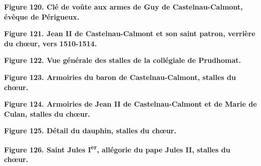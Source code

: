 \documentclass[12pt,twoside,openany]{book}
\begin{document}
\begin{center}
\par\small \textbf{Figure 120. Clé de voûte aux armes de Guy de Castelnau-Calmont, évêque de Périgueux.}
\end{center}

\begin{center}
\par\small \textbf{Figure 121. Jean II de Castelnau-Calmont et son saint patron, verrière du chœur, vers 1510-1514.}
\end{center}

\begin{center}
\par\small \textbf{Figure 122. Vue générale des stalles de la collégiale de Prudhomat.}
\end{center}

\begin{center}
\par\small \textbf{Figure 123. Armoiries du baron de Castelnau-Calmont, stalles du chœur.}
\end{center}

\begin{center}
\par\small \textbf{Figure 124. Armoiries de Jean II de Castelnau-Calmont et de Marie de Culan, stalles du chœur.}
\end{center}

\begin{center}
\par\small \textbf{Figure 125. Détail du dauphin, stalles du chœur.}
\end{center}

\begin{center}
\par\small \textbf{Figure 126. Saint Jules I\textsuperscript{er}, allégorie du pape Jules II, stalles du chœur.}
\end{center}
\end{document}
